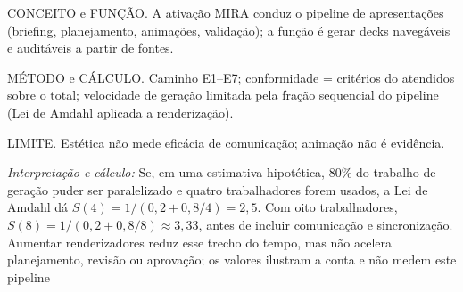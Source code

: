 \begin{descricao}
CONCEITO e FUNÇÃO. A ativação MIRA conduz o pipeline de apresentações
(briefing, planejamento, animações, validação); a função é gerar decks
navegáveis e auditáveis a partir de fontes.
\end{descricao}
\begin{metodo}
MÉTODO e CÁLCULO. Caminho E1--E7; conformidade = critérios do
 atendidos sobre o total; velocidade de geração limitada
pela fração sequencial do pipeline (Lei de Amdahl aplicada a renderização).
\end{metodo}
\begin{aviso}
LIMITE. Estética não mede eficácia de comunicação; animação não é evidência.
\end{aviso}
\noindent\textit{Interpretação e cálculo:} Se, em uma estimativa hipotética, $80\%$ do trabalho de geração puder ser paralelizado e quatro trabalhadores forem usados, a Lei de Amdahl dá $S(4)=1/(0{,}2+0{,}8/4)=2{,}5$. Com oito trabalhadores, $S(8)=1/(0{,}2+0{,}8/8)\approx3{,}33$, antes de incluir comunicação e sincronização. Aumentar renderizadores reduz esse trecho do tempo, mas não acelera planejamento, revisão ou aprovação; os valores ilustram a conta e não medem este pipeline  %
